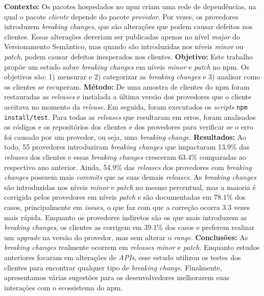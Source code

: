 \begin{resumo}

\textbf{Contexto:} Os pacotes hospedados no \textsf{npm} criam uma rede de dependências, na qual o pacote \textit{cliente} depende do pacote \textit{provedor}. Por vezes, os provedores introduzem \textit{breaking changes}, que são alterações que podem causar defeitos nos clientes. Essas alterações deveriam ser publicadas apenas no nível \textit{major} do Versionamento Semântico, mas quando são introduzidas nos níveis \textit{minor} ou \textit{patch}, podem causar defeitos inesperados nos clientes.
\textbf{Objetivo:} Este trabalho propõe um estudo sobre \textit{breaking changes} em níveis \textit{minor} e \textit{patch} no \textsf{npm}. Os objetivos são: 1) mensurar e 2) categorizar as \textit{breaking changes} e 3) analisar como os clientes se recuperam.
\textbf{Método:} De uma amostra de clientes do \textsf{npm} foram restauradas as \textit{releases} e instalada a última versão dos provedores que o cliente aceitava no momento da \textit{release}. Em seguida, foram executados os \textit{scripts} \texttt{npm install/test}. Para todas as \textit{releases} que resultaram em erros, foram analisados os códigos e os repositórios dos clientes e dos provedores para verificar se o erro foi causado por um provedor, ou seja, uma \textit{breaking change}.
\textbf{Resultados:} Ao todo, 55 provedores introduziram \textit{breaking changes} que impactaram 13.9\% das \textit{releases} dos clientes e essas \textit{breaking changes} cresceram 63.4\% comparadas ao respectivo ano anterior. Ainda, 54.9\% das \textit{releases} dos provedores com \textit{breaking changes} possuem mais \textit{commits} que as suas demais \textit{releases}. As \textit{breaking changes} são introduzidas nos níveis \textit{minor} e \textit{patch} no mesmo percentual, mas a maioria é corrigida pelos provedores em níveis \textit{patch} e são documentadas em 78.1\% dos casos, principalmente em \textit{issues}, o que faz com que a correção ocorra 3.3 vezes mais rápida. Enquanto os provedores indiretos são os que mais introduzem as \textit{breaking changes}, os clientes as corrigem em 39.1\% dos casos e preferem realizar um \textit{upgrade} na versão do provedor, mas sem alterar o \textit{range}.
\textbf{Conclusões:} As \textit{breaking changes} realmente ocorrem em \textit{releases minor} e \textit{patch}. Enquanto estudos anteriores focaram em alterações de \textit{APIs}, esse estudo utilizou os testes dos clientes para encontrar qualquer tipo de \textit{breaking change}. Finalmente, apresentamos várias sugestões para os desenvolvedores melhorarem suas interações com o ecossistema do \textsf{npm}.

\end{resumo}